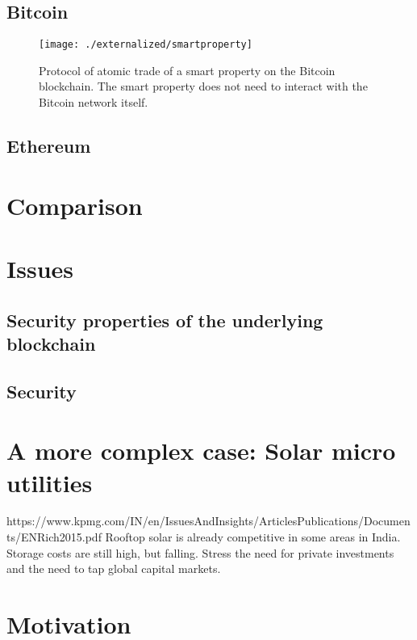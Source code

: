\subsection{Bitcoin}

\begin{figure}[!t]
    \centering
    \texttt{[image: ./externalized/smartproperty]}
    \caption{Protocol of atomic trade of a smart property on the Bitcoin blockchain. The smart property does not need to interact with the Bitcoin network itself.}
    \label{fig:smartproperty}
  \end{figure}

\subsection{Ethereum}


\section{Comparison}

\section{Issues}

\subsection{Security properties of the underlying blockchain}

\subsection{Security}


\section{A more complex case: Solar micro utilities}




https://www.kpmg.com/IN/en/IssuesAndInsights/ArticlesPublications/Documents/ENRich2015.pdf
Rooftop solar is already competitive in some areas in India. Storage costs are still high, but falling. Stress the need for private investments and the need to tap global capital markets.

\section{Motivation}

